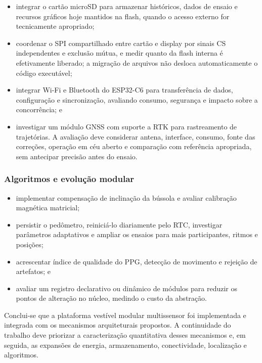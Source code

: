 \documentclass[a4paper,12pt]{article}
\begin{document}
\begin{itemize}
    \item integrar o cart\~ao microSD para armazenar hist\'oricos, dados de ensaio e recursos gr\'aficos hoje mantidos na flash, quando o acesso externo for tecnicamente apropriado;
    \item coordenar o SPI compartilhado entre cart\~ao e display por sinais CS independentes e exclus\~ao m\'utua, e medir quanto da flash interna \'e efetivamente liberado; a migra\c{c}\~ao de arquivos n\~ao desloca automaticamente o c\'odigo execut\'avel;
    \item integrar Wi-Fi e Bluetooth do ESP32-C6 para transfer\^encia de dados, configura\c{c}\~ao e sincroniza\c{c}\~ao, avaliando consumo, seguran\c{c}a e impacto sobre a concorr\^encia; e
    \item investigar um m\'odulo GNSS com suporte a RTK para rastreamento de trajet\'orias. A avalia\c{c}\~ao deve considerar antena, interface, consumo, fonte das corre\c{c}\~oes, opera\c{c}\~ao em c\'eu aberto e compara\c{c}\~ao com refer\^encia apropriada, sem antecipar precis\~ao antes do ensaio.
\end{itemize}


\subsubsection{Algoritmos e evolu\c{c}\~ao modular}


\begin{itemize}
    \item implementar compensa\c{c}\~ao de inclina\c{c}\~ao da b\'ussola e avaliar calibra\c{c}\~ao magn\'etica matricial;
    \item persistir o ped\^ometro, reinici\'a-lo diariamente pelo RTC, investigar par\^ametros adaptativos e ampliar os ensaios para mais participantes, ritmos e posi\c{c}\~oes;
    \item acrescentar \'indice de qualidade do PPG, detec\c{c}\~ao de movimento e rejei\c{c}\~ao de artefatos; e
    \item avaliar um registro declarativo ou din\^amico de m\'odulos para reduzir os pontos de altera\c{c}\~ao no n\'ucleo, medindo o custo da abstra\c{c}\~ao.
\end{itemize}


Conclui-se que a plataforma vest\'ivel modular multissensor foi implementada e integrada com os mecanismos arquiteturais propostos. A continuidade do trabalho deve priorizar a caracteriza\c{c}\~ao quantitativa desses mecanismos e, em seguida, as expans\~oes de energia, armazenamento, conectividade, localiza\c{c}\~ao e algoritmos.
\end{document}
